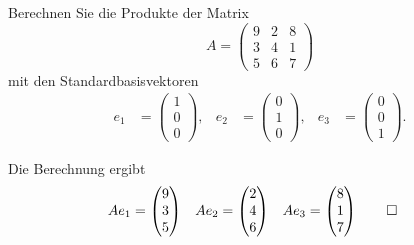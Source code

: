 Berechnen Sie die Produkte der Matrix
\[
A
=
\begin{pmatrix}
    9&  2&  8\\
    3&  4&  1\\
    5&  6&  7
\end{pmatrix}
\]
mit den Standardbasisvektoren
\begin{align*}
e_1
&=
\begin{pmatrix}1\\0\\0\end{pmatrix},&
e_2
&=
\begin{pmatrix}0\\1\\0\end{pmatrix},&
e_3
&=
\begin{pmatrix}0\\0\\1\end{pmatrix}.
\end{align*}

\begin{loesung}
Die Berechnung ergibt
\begin{align*}
Ae_1
&=
\begin{pmatrix}9\\3\\5\end{pmatrix}
&
Ae_2
&=
\begin{pmatrix}2\\4\\6\end{pmatrix}
&
Ae_3
&=
\begin{pmatrix}8\\1\\7\end{pmatrix}
\qedhere
\end{align*}
\end{loesung}
